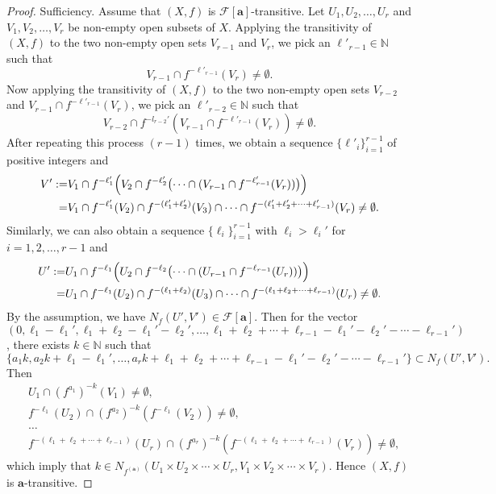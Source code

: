 \documentclass[12pt,a4paper]{amsart}
\theoremstyle{definition}
\numberwithin{equation}{section}
\begin{document}
\begin{proof}
Sufficiency. Assume that $(X,f)$ is $\mathcal{F}[\mathbf{a}]$-transitive.
Let $U_1,U_2,\dotsc,U_r$ and $V_1, V_2,\dotsc,V_r$ be non-empty open subsets of $X$.
Applying the transitivity of $(X,f)$ to the two non-empty open sets $V_{r-1}$ and $V_r$,
we pick an $\ell'_{r-1}\in\mathbb{N}$ such that
\[V_{r-1}\cap f^{-\ell'_{r-1}}(V_r)\neq\emptyset.\]
Now applying the transitivity of $(X,f)$ to the two non-empty open sets $V_{r-2}$ and $V_{r-1}\cap f^{-\ell'_{r-1}}(V_r)$,
we pick an $\ell'_{r-2}\in \mathbb{N}$ such that
\[V_{r-2}\cap f^{-l_{r-2}'}(V_{r-1}\cap f^{-\ell'_{r-1}}(V_r))\neq\emptyset.\]
After repeating this process $(r-1)$ times,
we obtain a sequence $\{\ell'_i\}_{i=1}^{r-1}$ of positive integers and
\begin{align*}
V':=&V_1\cap f^{-\ell'_{1}}\Bigl(V_{2}\cap f^{-\ell'_{2}}\bigl(\dotsb\cap(V_{r-1}\cap f^{-\ell'_{r-1}}(V_r))\bigr)\Bigr)\\
=& V_1\cap f^{-\ell'_{1}}(V_{2})\cap f^{-(\ell'_{1}+\ell'_{2})}(V_{3})\cap\dotsb\cap
 f^{-(\ell'_{1}+\ell'_{2}+\dotsb+\ell'_{r-1})}(V_r)\neq\emptyset.
\end{align*}
Similarly, we can also obtain a sequence $\{\ell_i\}_{i=1}^{r-1}$  with $\ell_i>\ell_i'$ for $i=1,2,\dotsc,r-1$ and
\begin{align*}
U':=&U_1\cap f^{-\ell_{1}}\Bigl(U_{2}\cap f^{-\ell_{2}}\bigl(\dotsb\cap(U_{r-1}\cap f^{-\ell_{r-1}}(U_r))\bigr)\Bigr)\\
=& U_1\cap f^{-\ell_{1}}(U_{2})\cap f^{-(\ell_{1}+\ell_{2})}(U_{3})\cap\dotsb\cap
 f^{-(\ell_{1}+\ell_{2}+\dotsb+\ell_{r-1})}(U_r)\neq\emptyset.
\end{align*}
By the assumption, we have $N_f(U',V')\in\mathcal{F}[\mathbf{a}]$.
Then for the vector $(0, \ell_1-\ell_1', \ell_1+\ell_2-\ell_1'-\ell_2',\dotsc,
\ell_1+\ell_2+\dotsb+\ell_{r-1}-\ell_1'-\ell_2'-\dotsb-\ell_{r-1}')$,
there exists $k\in \mathbb{N}$ such that
\[\{a_1k,a_2k+\ell_1-\ell_1',\dotsc,a_rk+\ell_1+\ell_2+\dotsb+\ell_{r-1}-\ell_1'-\ell_2'-\dotsb-\ell_{r-1}'\}
\subset N_f(U', V').\]
Then
\begin{align*}
  &U_1\cap (f^{a_1})^{-k} (V_1)\neq\emptyset,\\
  &f^{-\ell_1}(U_2)\cap (f^{a_2})^{-k}(f^{-\ell_1}(V_2))\neq\emptyset,\\
  &\dotsc \\
  &f^{-(\ell_1+\ell_2+\dotsb+\ell_{r-1})}(U_r)\cap
  (f^{a_r})^{-k}(f^{-(\ell_1+\ell_2+\dotsb+\ell_{r-1})}(V_r))\neq\emptyset,
\end{align*}
which imply that $k\in N_{f^{(\mathbf{a})}}(U_1\times U_2\times\dotsb\times U_r,
V_1\times V_2\times\dotsb \times V_r)$.
Hence $(X,f)$ is $\mathbf{a}$-transitive.
\end{proof}
\end{document}

